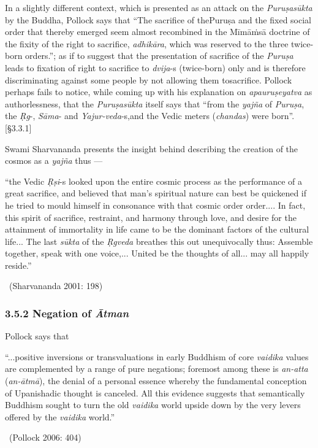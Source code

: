 In a slightly different context, which is presented as an attack on the \textit{Puruṣasūkta} by the Buddha, Pollock says that “The sacrifice of the\break Puruṣa and the fixed social order that thereby emerged seem almost recombined in the Mīmāṁsā doctrine of the fixity of the right to sacrifice, \textit{adhikāra}, which was reserved to the three twice-born orders.”; as if to suggest that the presentation of sacrifice of the \textit{Puruṣa} leads to fixation of right to sacrifice to \textit{dvija}-s (twice-born) only and is therefore discriminating against some people by not allowing them to\break sacrifice. Pollock perhaps fails to notice, while coming up with his explanation on \textit{apauruṣeyatva} as authorlessness, that the \textit{Puruṣasūkta} itself says that “from the \textit{yajña} of \textit{Puruṣa}, the \textit{Ṛg}-, \textit{Sāma}- and \textit{Yajur-veda}-s,\break and the Vedic meters (\textit{chandas}) were born”. [§3.3.1]

Swami Sharvananda presents the insight behind describing the creation of the cosmos as a \textit{yajña }thus —

\begin{myquote}
“the Vedic \textit{Ṛṣi}-s looked upon the entire cosmic process as the performance of a great sacrifice, and believed that man’s spiritual nature can best be quickened if he tried to mould himself in consonance with that cosmic order order.... In fact, this spirit of sacrifice, restraint, and harmony through love, and desire for the attainment of immortality in life came to be the dominant factors of the cultural life... The last \textit{sūkta} of the \textit{Ṛgveda} breathes this out unequivocally thus: Assemble together, speak with one voice,... United be the thoughts of all... may all happily reside.” 

~\hfill (Sharvananda 2001: 198)
\end{myquote}


\subsubsection*{3.5.2 Negation of \textit{Ātman}}

Pollock says that

\begin{myquote}
“...positive inversions or transvaluations in early Buddhism of core \textit{vaidika} values are complemented by a range of pure negations; foremost among these is \textit{an-atta} (\textit{an-ātmā}), the denial of a personal essence whereby the fundamental conception of Upanishadic thought is canceled. All this evidence suggests that semantically Buddhism sought to turn the old \textit{vaidika} world upside down by the very levers offered by the \textit{vaidika} world.” 

~\hfill (Pollock 2006: 404)
\end{myquote}

